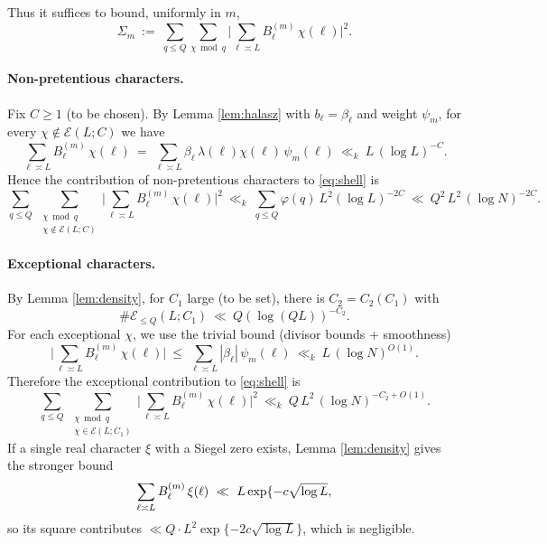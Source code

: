 \documentclass[11pt]{article}
\theoremstyle{definition}
\theoremstyle{remark}
\begin{document}
Thus it suffices to bound, uniformly in $m$,
\begin{equation}\label{eq:shell}
\Sigma_m\ :=\ \sum_{q\le Q}\sum_{\chi\bmod q}\Big|\sum_{\ell\asymp L} B^{(m)}_\ell\,\chi(\ell)\Big|^2.
\end{equation}

\paragraph{Non-pretentious characters.}
Fix $C\ge 1$ (to be chosen). By Lemma \ref{lem:halasz} with $b_\ell=\beta_\ell$ and weight $\psi_m$, for every $\chi\notin\mathcal E(L;C)$ we have
\[
\sum_{\ell\asymp L} B^{(m)}_\ell\,\chi(\ell)
\ =\ \sum_{\ell\asymp L} \beta_\ell\,\lambda(\ell)\chi(\ell)\,\psi_m(\ell)
\ \ll_{k}\ L\,(\log L)^{-C}.
\]
Hence the contribution of non-pretentious characters to \eqref{eq:shell} is
\begin{equation}\label{eq:nonpret}
\sum_{q\le Q}\ \sum_{\substack{\chi\bmod q\\ \chi\notin\mathcal E(L;C)}}
\Big|\sum_{\ell\asymp L} B^{(m)}_\ell\,\chi(\ell)\Big|^2
\ \ll_{k}\ \sum_{q\le Q}\varphi(q)\ L^2(\log L)^{-2C}
\ \ll\ Q^2\,L^2\,(\log N)^{-2C}.
\end{equation}

\paragraph{Exceptional characters.}
By Lemma \ref{lem:density}, for $C_1$ large (to be set), there is $C_2=C_2(C_1)$ with
\[
\#\mathcal E_{\le Q}(L;C_1)\ \ll\ Q(\log (QL))^{-C_2}.
\]
For each exceptional $\chi$, we use the trivial bound (divisor bounds + smoothness)
\[
\Big|\sum_{\ell\asymp L} B^{(m)}_\ell\,\chi(\ell)\Big|
\ \le\ \sum_{\ell\asymp L} |\beta_\ell|\,\psi_m(\ell)
\ \ll_{k}\ L\,(\log N)^{O(1)}.
\]
Therefore the exceptional contribution to \eqref{eq:shell} is
\begin{equation}\label{eq:exceptional}
\sum_{q\le Q}\ \sum_{\substack{\chi\bmod q\\ \chi\in\mathcal E(L;C_1)}}
\Big|\sum_{\ell\asymp L} B^{(m)}_\ell\,\chi(\ell)\Big|^2
\ \ll_{k}\ Q\,L^2\,(\log N)^{-C_2+O(1)}.
\end{equation}
If a single real character $\xi$ with a Siegel zero exists, Lemma \ref{lem:density} gives the stronger bound
\[
\sum_{\ell\asymp L} B^{(m)}_\ell\,\xi(\ell)\ \ll\ L\exp\{-c\sqrt{\log L}\\,
\]
so its square contributes $\ll Q\cdot L^2\exp\{-2c\sqrt{\log L}\}$, which is negligible.
\end{document}
